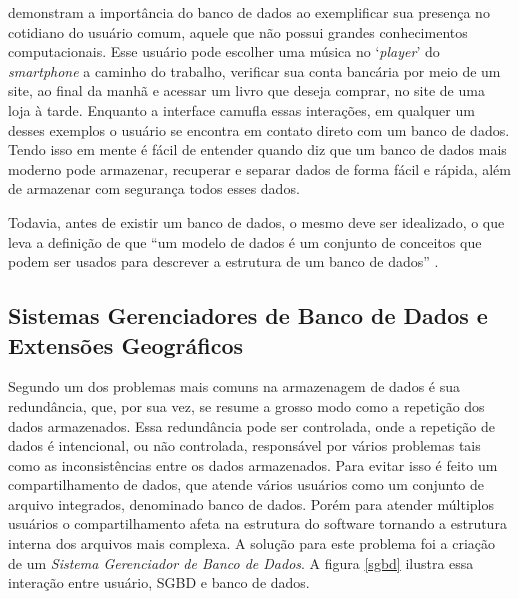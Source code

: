  demonstram a importância do banco de dados ao exemplificar sua presença no cotidiano do usuário comum, aquele que não possui grandes conhecimentos computacionais. Esse usuário pode escolher uma música no `\textit{player}' do \textit{smartphone} a caminho do trabalho, verificar sua conta bancária por meio de um site, ao final da manhã e acessar um livro que deseja comprar, no site de uma loja à tarde. Enquanto a interface camufla essas interações, em qualquer um desses exemplos o usuário se encontra em contato direto com um banco de dados. Tendo isso em mente é fácil de entender quando  diz que um banco de dados mais moderno pode armazenar, recuperar e separar dados de forma fácil e rápida, além de armazenar com segurança todos esses dados.

Todavia, antes de existir um banco de dados, o mesmo deve ser idealizado, o que leva a definição de que ``um modelo de dados é um conjunto de conceitos que podem ser usados para descrever a estrutura de um banco de dados'' \cite[p.19]{navathe2011fundamentals}.

\subsection{Sistemas Gerenciadores de Banco de Dados e Extensões Geográficos} \label{sgbdeg}

Segundo  um dos problemas mais comuns na armazenagem de dados é sua redundância, que, por sua vez, se resume a grosso modo como a repetição dos dados armazenados. Essa redundância pode ser controlada, onde a repetição de dados é intencional, ou não controlada, responsável por vários problemas tais como as inconsistências entre os dados armazenados. Para evitar isso é feito um compartilhamento de dados, que atende vários usuários como um conjunto de arquivo integrados, denominado banco de dados. Porém para atender múltiplos usuários o compartilhamento afeta na estrutura do software tornando a estrutura interna dos arquivos mais complexa. A solução para este problema foi a criação de um \textit{Sistema Gerenciador de Banco de Dados}. 
A figura \ref{sgbd} ilustra essa interação entre usuário, SGBD e banco de dados.

